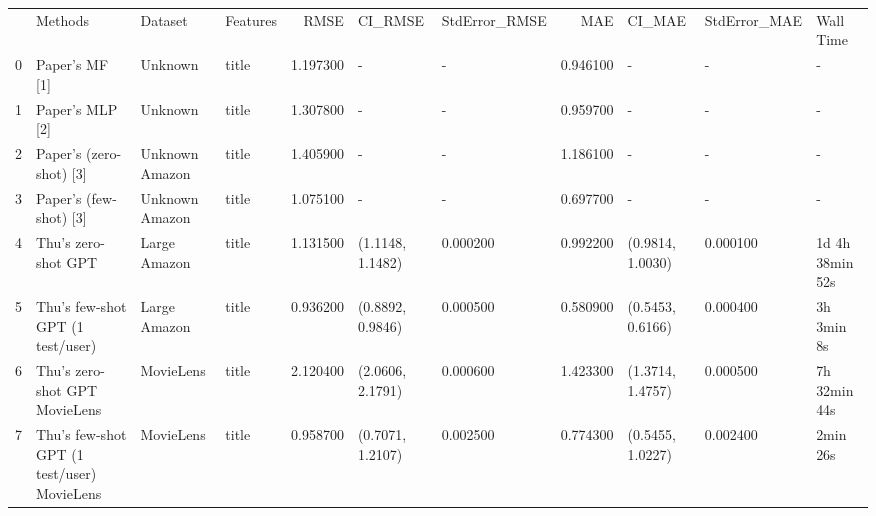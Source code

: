\begin{tabular}{llllrllrlll}
 & Methods & Dataset & Features & RMSE & CI_RMSE & StdError_RMSE & MAE & CI_MAE & StdError_MAE & Wall Time \\
0 & Paper's MF [1] & Unknown & title & 1.197300 & - & - & 0.946100 & - & - & - \\
1 & Paper's MLP [2] & Unknown & title & 1.307800 & - & - & 0.959700 & - & - & - \\
2 & Paper's (zero-shot) [3] & Unknown Amazon & title & 1.405900 & - & - & 1.186100 & - & - & - \\
3 & Paper's (few-shot) [3] & Unknown Amazon & title & 1.075100 & - & - & 0.697700 & - & - & - \\
4 & Thu's zero-shot GPT & Large Amazon & title & 1.131500 & (1.1148, 1.1482) & 0.000200 & 0.992200 & (0.9814, 1.0030) & 0.000100 & 1d 4h 38min 52s \\
5 & Thu's few-shot GPT (1 test/user) & Large Amazon & title & 0.936200 & (0.8892, 0.9846) & 0.000500 & 0.580900 & (0.5453, 0.6166) & 0.000400 & 3h 3min 8s \\
6 & Thu's zero-shot GPT MovieLens & MovieLens & title & 2.120400 & (2.0606, 2.1791) & 0.000600 & 1.423300 & (1.3714, 1.4757) & 0.000500 & 7h 32min 44s \\
7 & Thu's few-shot GPT (1 test/user) MovieLens & MovieLens & title & 0.958700 & (0.7071, 1.2107) & 0.002500 & 0.774300 & (0.5455, 1.0227) & 0.002400 & 2min 26s \\
\end{tabular}
